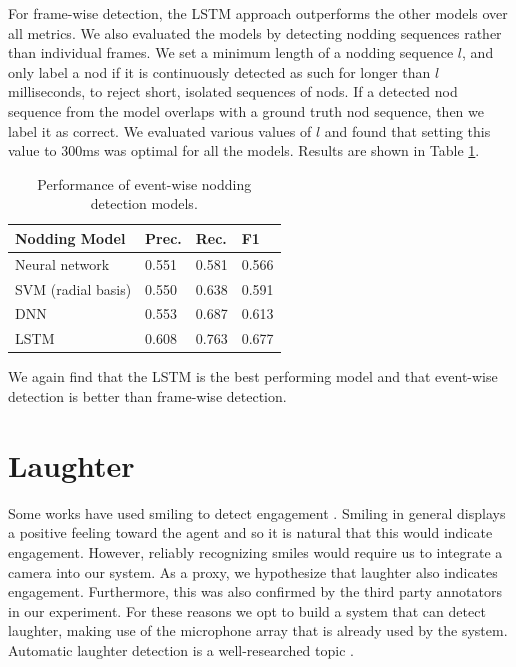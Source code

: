 \documentclass[letterpaper]{article} %
\begin{document}
For frame-wise detection, the LSTM approach outperforms the other models over all metrics. We also evaluated the models by detecting nodding sequences rather than individual frames. We set a minimum length of a nodding sequence $l$, and only label a nod if it is continuously detected as such for longer than $l$ milliseconds, to reject short, isolated sequences of nods. If a detected nod sequence from the model overlaps with a ground truth nod sequence, then we label it as correct. We evaluated various values of $l$ and found that setting this value to 300ms was optimal for all the models. Results are shown in Table \ref{nodresultsevent}.

\begin{table}[h]
\begin{center}
\begin{tabular}{|l|l|l|l|}
\hline \bf Nodding Model & \bf Prec. & \bf Rec. & \bf F1\\ \hline
Neural network & 0.551 & 0.581 & 0.566 \\
SVM (radial basis) & 0.550 & 0.638 & 0.591 \\
DNN & 0.553 & 0.687 & 0.613 \\
LSTM & 0.608 & 0.763 & 0.677 \\
\hline
\end{tabular}
\end{center}
\caption{\label{nodresultsevent} Performance of event-wise nodding detection models.}
\end{table}

We again find that the LSTM is the best performing model and that event-wise detection is better than frame-wise detection.

\section{Laughter}
Some works have used smiling to detect engagement \cite{Castellano2009,Yu2017}. Smiling in general displays a positive feeling toward the agent and so it is natural that this would indicate engagement. However, reliably recognizing smiles would require us to integrate a camera into our system. As a proxy, we hypothesize that laughter also indicates engagement. Furthermore, this was also confirmed by the third party annotators in our experiment. For these reasons we opt to build a system that can detect laughter, making use of the microphone array that is already used by the system. Automatic laughter detection is a well-researched topic \cite{Cosentino2016}.
\end{document}
